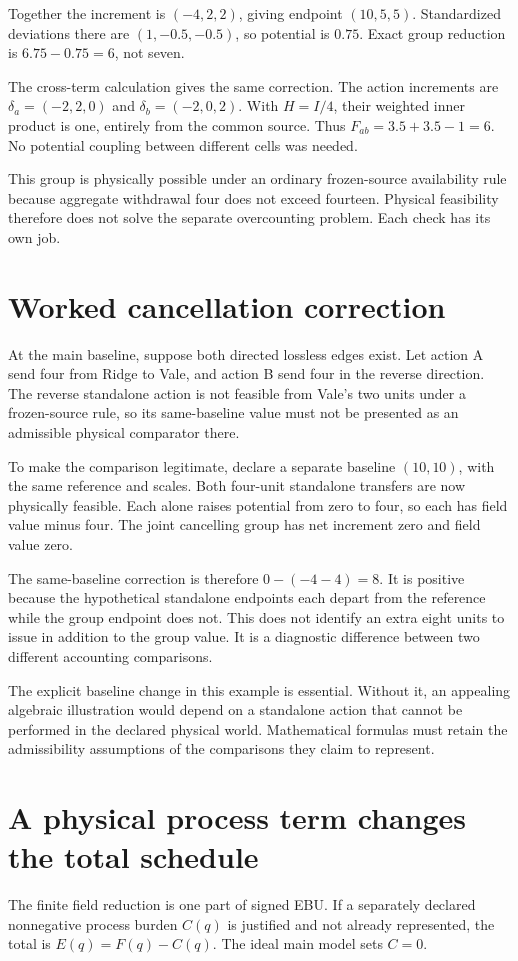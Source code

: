 Together the increment is \((-4,2,2)\), giving endpoint \((10,5,5)\). Standardized deviations there are \((1,-0.5,-0.5)\), so potential is \(0.75\). Exact group reduction is \(6.75-0.75=6\), not seven.

The cross-term calculation gives the same correction. The action increments are \(\delta_a=(-2,2,0)\) and \(\delta_b=(-2,0,2)\). With \(H=I/4\), their weighted inner product is one, entirely from the common source. Thus \(F_{ab}=3.5+3.5-1=6\). No potential coupling between different cells was needed.

This group is physically possible under an ordinary frozen-source availability rule because aggregate withdrawal four does not exceed fourteen. Physical feasibility therefore does not solve the separate overcounting problem. Each check has its own job.

\section{Worked cancellation correction}
At the main baseline, suppose both directed lossless edges exist. Let action A send four from Ridge to Vale, and action B send four in the reverse direction. The reverse standalone action is not feasible from Vale's two units under a frozen-source rule, so its same-baseline value must not be presented as an admissible physical comparator there.

To make the comparison legitimate, declare a separate baseline \((10,10)\), with the same reference and scales. Both four-unit standalone transfers are now physically feasible. Each alone raises potential from zero to four, so each has field value minus four. The joint cancelling group has net increment zero and field value zero.

The same-baseline correction is therefore \(0-(-4-4)=8\). It is positive because the hypothetical standalone endpoints each depart from the reference while the group endpoint does not. This does not identify an extra eight units to issue in addition to the group value. It is a diagnostic difference between two different accounting comparisons.

The explicit baseline change in this example is essential. Without it, an appealing algebraic illustration would depend on a standalone action that cannot be performed in the declared physical world. Mathematical formulas must retain the admissibility assumptions of the comparisons they claim to represent.

\section{A physical process term changes the total schedule}
The finite field reduction is one part of signed EBU. If a separately declared nonnegative process burden \(C(q)\) is justified and not already represented, the total is \(E(q)=F(q)-C(q)\). The ideal main model sets \(C=0\).

